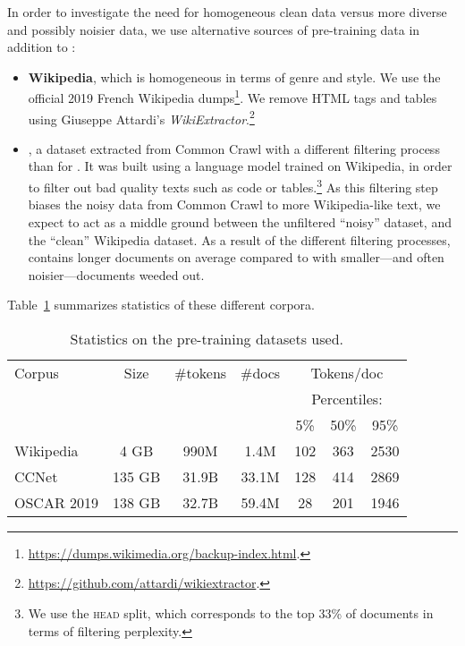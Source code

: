 In order to investigate the need for homogeneous clean data versus more diverse and possibly noisier data, we use alternative sources of pre-training data in addition to :
\begin{itemize}
    \item \textbf{Wikipedia}, which is homogeneous in terms of genre and style. We use the official 2019 French Wikipedia dumps\footnote{ \url{https://dumps.wikimedia.org/backup-index.html}.}. We remove HTML tags and tables using Giuseppe Attardi's  \emph{WikiExtractor}.\footnote{ \url{https://github.com/attardi/wikiextractor}.}
    \item \textbf{\ccnet} \citep{wenzek-etal-2020-ccnet}, a dataset extracted from Common Crawl with a different filtering process than for \oscar. It was built using a language model trained on Wikipedia, in order to filter out bad quality texts such as code or tables.\footnote{We use the \textsc{head} split, which corresponds to the top 33\% of documents in terms of filtering perplexity.} As this filtering step biases the noisy data from Common Crawl to more Wikipedia-like text, we expect \ccnet to act as a middle ground between the unfiltered ``noisy''  dataset, and the ``clean'' Wikipedia dataset. As a result of the different filtering processes, \ccnet contains longer documents on average compared to  with smaller---and often noisier---documents weeded out.
\end{itemize}
Table~\ref{table:corpora_statistics} summarizes statistics of these different corpora.

\begin{table}[ht]
    \centering\small
    \begin{tabular}{lcccccc}
        \toprule
        Corpus     & Size  & \#tokens & \#docs & \multicolumn{3}{c}{Tokens/doc}                 \\
                   &       &          &        & \multicolumn{3}{c}{Percentiles:}               \\
                   &       &          &        & 5\%                              & 50\% & 95\% \\
        \midrule
        Wikipedia  & 4 GB   & 990M     & 1.4M   & 102                              & 363  & 2530 \\
        CCNet      & 135 GB & 31.9B    & 33.1M  & 128                              & 414  & 2869 \\
        OSCAR 2019 & 138 GB & 32.7B    & 59.4M  & 28                               & 201  & 1946 \\
        \bottomrule
    \end{tabular}
    \caption{Statistics on the pre-training datasets used.}
    \label{table:corpora_statistics}
\end{table}

